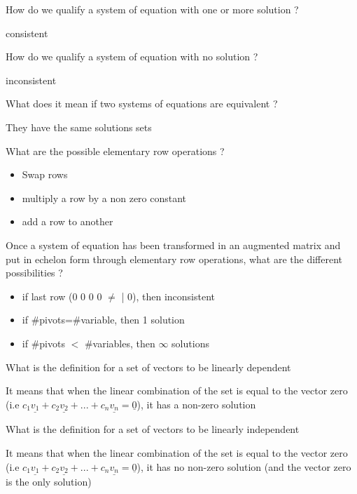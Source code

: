\documentclass[12pt]{article}
\newcommand*{\xfield}[1]{\begin{mdframed}\centering #1\end{mdframed}\bigskip}
\newenvironment{note}{}{}
\begin{document}
\begin{note}
    \xfield{How do we qualify a system of equation with one or more solution ?}
    \xfield{consistent}
\end{note}

\begin{note}
    \xfield{How do we qualify a system of equation with no solution ?}
    \xfield{inconsistent}
\end{note}

\begin{note}
    \xfield{What does it mean if two systems of equations are equivalent ?}
    \xfield{They have the same solutions sets}
\end{note}

\begin{note}
    \xfield{What are the possible elementary row operations ?}
    \xfield{\begin{itemize} \item Swap rows \item  multiply a row by a non zero constant \item  add a row to another \end{itemize}}
\end{note}

\begin{note}
    \xfield{Once a system of equation has been transformed in an augmented matrix and put in echelon form through elementary row operations, what are the different possibilities ?}
    \xfield{\begin{itemize} \item if last row (0 0 0 0 $\neq$ | 0), then inconsistent \item if \#pivots=\#variable, then 1 solution \item if \#pivots $<$ \#variables, then $\infty$ solutions \end{itemize}}
\end{note}

\begin{note}
    \xfield{What is the definition for a set of vectors to be linearly dependent}
    \xfield{It means that when the linear combination of the set is equal to the vector zero (i.e \begin{math}c_1\underline{v_1}+c_2\underline{v_2}+...+c_n\underline{v_n}=\underline{0}\end{math}), it has a non-zero solution}
\end{note}

\begin{note}
    \xfield{What is the definition for a set of vectors to be linearly independent}
    \xfield{It means that when the linear combination of the set is equal to the vector zero (i.e \begin{math}c_1\underline{v_1}+c_2\underline{v_2}+...+c_n\underline{v_n}=\underline{0}\end{math}), it has no non-zero solution (and the vector zero is the only solution)}
\end{note}
\end{document}
